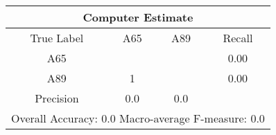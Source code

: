 \begin{tabular}{|c||c|c||c|}
\hline 
\multicolumn{4}{|c|}{Computer Estimate}\\
\hline 
True Label & A65 & A89 & Recall \\
\hline 
A65 &  & & 0.00\\
A89 & 1 &  & 0.00\\
\hline 
Precision & 0.0 & 0.0 & \\
\hline 
\multicolumn{4}{|c|}{Overall Accuracy: 0.0 Macro-average F-measure: 0.0}\\
\hline 
\end{tabular} 
